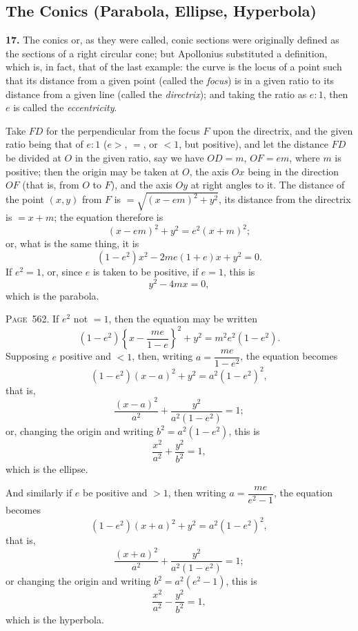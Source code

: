 \documentclass[11pt,a4paper]{book}
\begin{document}
\subsection*{The Conics (Parabola, Ellipse, Hyperbola)}

\textbf{17.} The conics or, as they were called, conic sections were originally defined as the sections of a right circular cone; but Apollonius substituted a definition, which is, in fact, that of the last example: the curve is the locus of a point such that its distance from a given point (called the \textit{focus}) is in a given ratio to its distance from a given line (called the \textit{directrix}); and taking the ratio as $e:1$, then $e$ is called the \textit{eccentricity}.

Take $FD$ for the perpendicular from the focus $F$ upon the directrix, and the given ratio being that of $e:1$ ($e>$, $=$, or $<1$, but positive), and let the distance $FD$ be divided at $O$ in the given ratio, say we have $OD=m$, $OF=em$, where $m$ is positive; then the origin may be taken at $O$, the axis $Ox$ being in the direction $OF$ (that is, from $O$ to $F$), and the axis $Oy$ at right angles to it. The distance of the point $(x,y)$ from $F$ is $=\sqrt{(x-em)^2+y^2}$, its distance from the directrix is $=x+m$; the equation therefore is
\[
(x-em)^2+y^2=e^2(x+m)^2;
\]
or, what is the same thing, it is
\[
(1-e^2)x^2-2me(1+e)x+y^2=0.
\]
If $e^2=1$, or, since $e$ is taken to be positive, if $e=1$, this is
\[
y^2-4mx=0,
\]
which is the parabola.

\newpage
\noindent\textsc{Page~562.} If $e^2$ not $=1$, then the equation may be written
\[
(1-e^2)\left\{x-\frac{me}{1-e}\right\}^2+y^2=m^2e^2(1-e^2).
\]
Supposing $e$ positive and $<1$, then, writing $a=\dfrac{me}{1-e^2}$, the equation becomes
\[
(1-e^2)(x-a)^2+y^2=a^2(1-e^2)^2,
\]
that is,
\[
\frac{(x-a)^2}{a^2}+\frac{y^2}{a^2(1-e^2)}=1;
\]
or, changing the origin and writing $b^2=a^2(1-e^2)$, this is
\[
\frac{x^2}{a^2}+\frac{y^2}{b^2}=1,
\]
which is the ellipse.

And similarly if $e$ be positive and $>1$, then writing $a=\dfrac{me}{e^2-1}$, the equation becomes
\[
(1-e^2)(x+a)^2+y^2=a^2(1-e^2)^2,
\]
that is,
\[
\frac{(x+a)^2}{a^2}+\frac{y^2}{a^2(1-e^2)}=1;
\]
or changing the origin and writing $b^2=a^2(e^2-1)$, this is
\[
\frac{x^2}{a^2}-\frac{y^2}{b^2}=1,
\]
which is the hyperbola.
\end{document}

